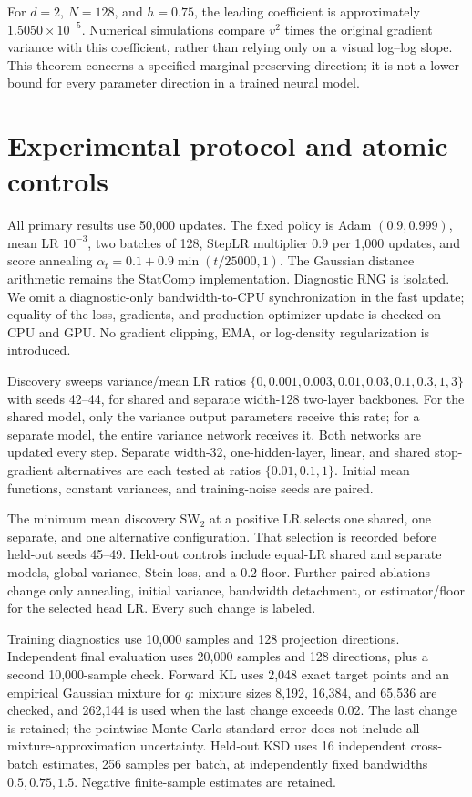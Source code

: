 \documentclass[11pt,a4paper]{article}
\begin{document}
For $d=2$, $N=128$, and $h=0.75$, the leading coefficient is approximately
$1.5050\times10^{-5}$. Numerical simulations compare $v^2$ times the original
gradient variance with this coefficient, rather than relying only on a visual
log--log slope. This theorem concerns a specified marginal-preserving direction;
it is not a lower bound for every parameter direction in a trained neural model.

\section{Experimental protocol and atomic controls}
All primary results use 50,000 updates. The fixed policy is Adam
$(0.9,0.999)$, mean LR $10^{-3}$, two batches of 128, StepLR multiplier 0.9
per 1,000 updates, and score annealing
$\alpha_t=0.1+0.9\min(t/25000,1)$. The Gaussian distance arithmetic remains
the StatComp implementation. Diagnostic RNG is isolated. We omit a
diagnostic-only bandwidth-to-CPU synchronization in the fast update; equality
of the loss, gradients, and production optimizer update is checked on CPU and
GPU. No gradient clipping, EMA, or log-density regularization is introduced.

Discovery sweeps variance/mean LR ratios
$\{0,0.001,0.003,0.01,0.03,0.1,0.3,1,3\}$ with seeds 42--44, for shared
and separate width-128 two-layer backbones. For the shared model, only the
variance output parameters receive this rate; for a separate model, the
entire variance network receives it. Both networks are updated every step.
Separate width-32, one-hidden-layer, linear, and shared stop-gradient
alternatives are each tested at ratios $\{0.01,0.1,1\}$. Initial mean
functions, constant variances, and training-noise seeds are paired.

The minimum mean discovery SW$_2$ at a positive LR selects one shared, one
separate, and one alternative configuration. That selection is recorded
before held-out seeds 45--49. Held-out controls include equal-LR shared and
separate models, global variance, Stein loss, and a $0.2$ floor. Further
paired ablations change only annealing, initial variance, bandwidth detachment,
or estimator/floor for the selected head LR. Every such change is labeled.

Training diagnostics use 10,000 samples and 128 projection directions.
Independent final evaluation uses 20,000 samples and 128 directions, plus a
second 10,000-sample check. Forward KL uses 2,048 exact target points and
an empirical Gaussian mixture for $q$: mixture sizes 8,192, 16,384, and
65,536 are checked, and 262,144 is used when the last change exceeds 0.02.
The last change is retained; the pointwise Monte Carlo standard error does
not include all mixture-approximation uncertainty. Held-out KSD uses 16
independent cross-batch estimates, 256 samples per batch, at independently
fixed bandwidths $0.5,0.75,1.5$. Negative finite-sample estimates are retained.
\end{document}
